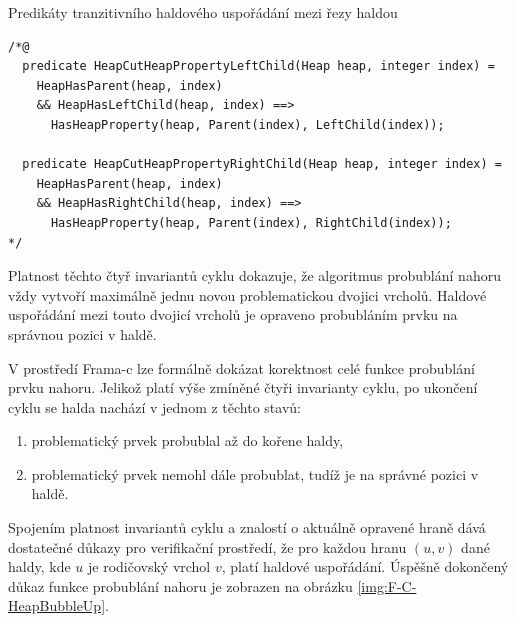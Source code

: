 \begin{listing}[H]
	\caption{Predikáty tranzitivního haldového uspořádání mezi řezy haldou}
	\label{acsl:HeapCutHeapPropertyTransitive}
	\begin{verbatim}
/*@
  predicate HeapCutHeapPropertyLeftChild(Heap heap, integer index) = 
    HeapHasParent(heap, index)
    && HeapHasLeftChild(heap, index) ==>
      HasHeapProperty(heap, Parent(index), LeftChild(index));

  predicate HeapCutHeapPropertyRightChild(Heap heap, integer index) =
    HeapHasParent(heap, index)
    && HeapHasRightChild(heap, index) ==>
      HasHeapProperty(heap, Parent(index), RightChild(index));
*/
	\end{verbatim}
\end{listing}

Platnost těchto čtyř invariantů cyklu dokazuje, že algoritmus probublání nahoru vždy vytvoří maximálně jednu novou problematickou dvojici vrcholů. Haldové uspořádání mezi touto dvojicí vrcholů je opraveno probubláním prvku na správnou pozici v haldě.

V prostředí Frama-c lze formálně dokázat korektnost celé funkce probublání prvku nahoru. Jelikož platí výše zmíněné čtyři invarianty cyklu, po ukončení cyklu se halda nachází v jednom z těchto stavů:

\begin{enumerate}
  \item problematický prvek probublal až do kořene haldy,
  \item problematický prvek nemohl dále probublat, tudíž je na správné pozici v haldě.
\end{enumerate}

Spojením platnost invariantů cyklu a znalostí o aktuálně opravené hraně dává dostatečné důkazy pro verifikační prostředí, že pro každou hranu $(u, v)$ dané haldy, kde $u$ je rodičovský vrchol $v$, platí haldové uspořádání. Úspěšně dokončený důkaz funkce probublání nahoru je zobrazen na obrázku \ref{img:F-C-HeapBubbleUp}.


